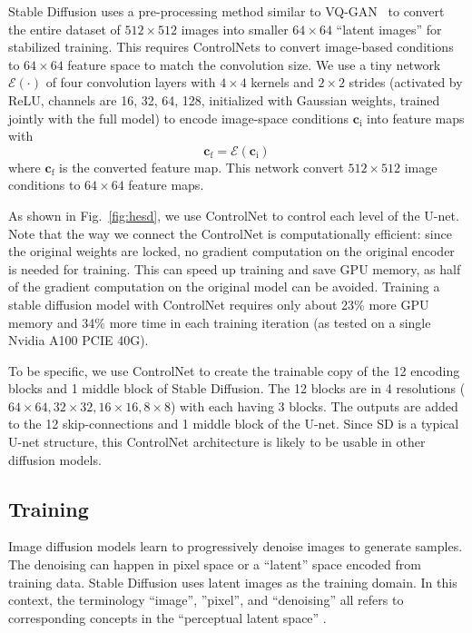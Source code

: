 \documentclass{article}
\begin{document}
Stable Diffusion uses a pre-processing method similar to VQ-GAN~\cite{DBLP:journals/corr/abs-2012-09841} to convert the entire dataset of $512\times 512$ images into smaller $64\times 64$ ``latent images'' for stabilized training. This requires ControlNets to convert image-based conditions to $64\times 64$ feature space to match the convolution size. We use a tiny network $\mathcal{E}(\cdot)$ of four convolution layers with $4\times 4$ kernels and $2 \times 2$ strides (activated by ReLU, channels are 16, 32, 64, 128, initialized with Gaussian weights, trained jointly with the full model) to encode image-space conditions $\bm{c}_\text{i}$ into feature maps with
\begin{equation}
	\bm{c}_\text{f}=\mathcal{E}(\bm{c}_\text{i})
\end{equation}
where $\bm{c}_\text{f}$ is the converted feature map. This network convert $512\times 512$ image conditions to $64\times 64$ feature maps.

As shown in Fig.~\ref{fig:hesd}, we use ControlNet to control each level of the U-net. Note that the way we connect the ControlNet is computationally efficient: since the original weights are locked, no gradient computation on the original encoder is needed for training. This can speed up training and save GPU memory, as half of the gradient computation on the original model can be avoided. Training a stable diffusion model with ControlNet requires only about 23\% more GPU memory and 34\% more time in each training iteration (as tested on a single Nvidia A100 PCIE 40G).

To be specific, we use ControlNet to create the trainable copy of the 12 encoding blocks and 1 middle block of Stable Diffusion. The 12 blocks are in 4 resolutions ($64\times64,32\times32,16\times16,8\times8$) with each having 3 blocks. The outputs are added to the 12 skip-connections and 1 middle block of the U-net. Since SD is a typical U-net structure, this ControlNet architecture is likely to be usable in other diffusion models.

\subsection{Training}
\label{train}

Image diffusion models learn to progressively denoise images to generate samples. The denoising can happen in pixel space or a ``latent'' space encoded from training data. Stable Diffusion uses latent images as the training domain. In this context, the terminology ``image'', ''pixel'', and ``denoising'' all refers to corresponding concepts in the ``perceptual latent space'' \cite{rombach2021highresolution}.
\end{document}
